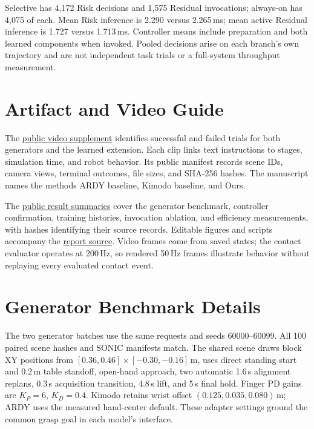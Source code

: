 Selective has 4,172 Risk decisions and 1,575 Residual invocations; always-on has 4,075 of each. Mean Risk inference is 2.290 versus 2.265\,ms; mean active Residual inference is 1.727 versus 1.713\,ms. Controller means include preparation and both learned components when invoked. Pooled decisions arise on each branch's own trajectory and are not independent task trials or a full-system throughput measurement.

\section{Artifact and Video Guide}
The \href{https://github.com/Peneplain/dl/tree/main/docs/report/videos}{public video supplement} identifies successful and failed trials for both generators and the learned extension. Each clip links text instructions to stages, simulation time, and robot behavior. Its public manifest records scene IDs, camera views, terminal outcomes, file sizes, and SHA-256 hashes. The manuscript names the methods ARDY baseline, Kimodo baseline, and Ours.

The \href{https://github.com/Peneplain/dl/tree/main/docs/report/results}{public result summaries} cover the generator benchmark, controller confirmation, training histories, invocation ablation, and efficiency measurements, with hashes identifying their source records. Editable figures and scripts accompany the \href{https://github.com/Peneplain/dl/tree/main/docs/report}{report source}. Video frames come from saved states; the contact evaluator operates at 200\,Hz, so rendered 50\,Hz frames illustrate behavior without replaying every evaluated contact event.

\section{Generator Benchmark Details}
The two generator batches use the same requests and seeds 60000--60099. All 100 paired scene hashes and SONIC manifests match. The shared scene draws block XY positions from $[0.36,0.46]\times[-0.30,-0.16]$\,m, uses direct standing start and 0.2\,m table standoff, open-hand approach, two automatic 1.6\,s alignment replans, 0.3\,s acquisition transition, 4.8\,s lift, and 5\,s final hold. Finger PD gains are $K_P=6$, $K_D=0.4$. Kimodo retains wrist offset $(0.125,0.035,0.080)$\,m; ARDY uses the measured hand-center default. These adapter settings ground the common grasp goal in each model's interface.


